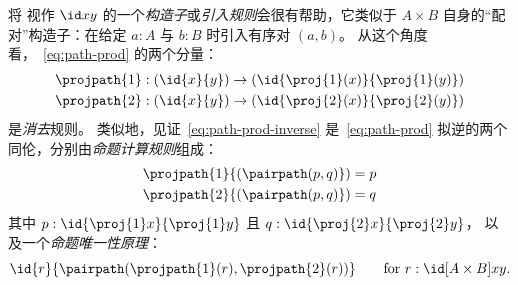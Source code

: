 将 \pairpath 视作 $\id x y$ 的一个\emph{构造子}或\emph{引入规则}会很有帮助，它类似于 $A\times B$ 自身的“配对”构造子：在给定 $a:A$ 与 $b:B$ 时引入有序对 $(a,b)$。
从这个角度看，~\eqref{eq:path-prod} 的两个分量：
\begin{align*}
  \projpath{1} &: (\id{x}{y}) \to (\id{\proj{1}(x)}{\proj{1} (y)})\\
  \projpath{2} &: (\id{x}{y}) \to (\id{\proj{2}(x)}{\proj{2} (y)})
\end{align*}
是\emph{消去}规则。
类似地，见证~\eqref{eq:path-prod-inverse} 是~\eqref{eq:path-prod} 拟逆的两个同伦，分别由\emph{命题计算规则}组成：
%
\begin{align*}
  {\projpath{1}{(\pairpath(p, q)})}
  &= %
  {p} \\
  {\projpath{2}{(\pairpath(p,q)})}
  &= %
  {q}
\end{align*}
其中 $p:\id{\proj{1} x}{\proj{1} y}$ 且 $q:\id{\proj{2} x}{\proj{2} y}$，
以及一个\emph{命题唯一性原理}：
%
\[
\id{r}{\pairpath(\projpath{1} (r), \projpath{2} (r)) }
\qquad\text{for } r : \id[A \times B] x y.
\]

